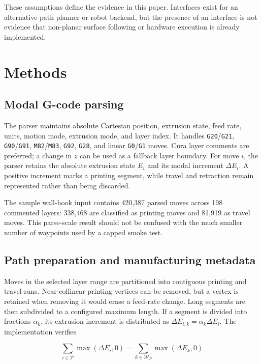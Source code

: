 \documentclass[letterpaper,10pt,conference]{ieeeconf}
\newcommand{\software}[1]{\texttt{#1}}
\begin{document}
These assumptions define the evidence in this paper.  Interfaces exist for an
alternative path planner or robot backend, but the presence of an interface is
not evidence that non-planar surface following or hardware execution is already
implemented.

\section{Methods}

\subsection{Modal G-code parsing}

The parser maintains absolute Cartesian position, extrusion state, feed rate,
units, motion mode, extrusion mode, and layer index.  It handles
\software{G20}/\software{G21}, \software{G90}/\software{G91},
\software{M82}/\software{M83}, \software{G92}, \software{G28}, and linear
\software{G0}/\software{G1} moves.  Cura layer comments are preferred; a change
in \(z\) can be used as a fallback layer boundary.  For move \(i\), the parser
retains the absolute extrusion state \(E_i\) and its modal increment
\(\Delta E_i\).  A positive increment marks a printing segment, while travel
and retraction remain represented rather than being discarded.

The sample wall-hook input contains 420,387 parsed moves across 198 commented
layers: 338,468 are classified as printing moves and 81,919 as travel moves.
This parse-scale result should not be confused with the much smaller number of
waypoints used by a capped smoke test.

\subsection{Path preparation and manufacturing metadata}

Moves in the selected layer range are partitioned into contiguous printing and
travel runs.  Near-collinear printing vertices can be removed, but a vertex is
retained when removing it would erase a feed-rate change.  Long segments are
then subdivided to a configured maximum length.  If a segment is divided into
fractions \(\alpha_k\), its extrusion increment is distributed as
\(\Delta E_{i,k}=\alpha_k\Delta E_i\).  The implementation verifies

\begin{equation}
  \sum_{i\in\mathcal{P}} \max(\Delta E_i,0)
  =
  \sum_{k\in\mathcal{W}_{\!P}} \max(\Delta E_k,0)
  \label{eq:extrusion-conservation}
\end{equation}
\end{document}
